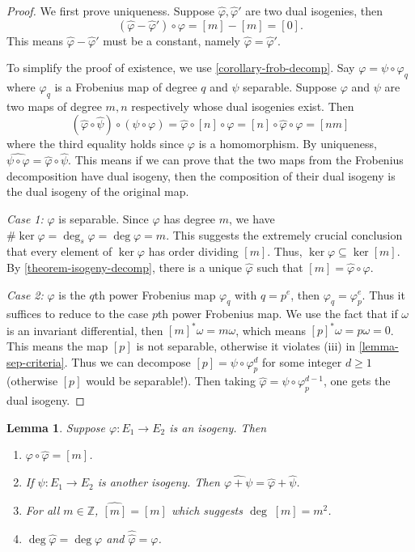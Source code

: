 \documentclass[12pt]{article}
\newtheorem{lemma}{Lemma}[subsection]
\theoremstyle{remark}
\theoremstyle{definition}
\newcommand{\w}[0]{\omega}
\newcommand{\Z}[0]{\mathbb{Z}}
\begin{document}
    \begin{proof}
        We first prove uniqueness. Suppose $\hat\varphi,\hat\varphi'$ are two dual isogenies, then \[\left(\hat\varphi-\hat\varphi'\right)\circ\varphi=[m]-[m]=[0].\] 
        This means $\hat\varphi-\hat\varphi'$ must be a constant, namely $\hat\varphi=\hat\varphi'$.

        To simplify the proof of existence, we use \autoref{corollary-frob-decomp}. Say $\varphi=\psi\circ\varphi_q$ where $\varphi_q$ is a Frobenius map of degree $q$ and $\psi$ separable. Suppose $\varphi$ and $\psi$ are two maps of degree $m,n$ respectively whose dual isogenies exist. Then 
        \[(\hat{\varphi}\circ\hat\psi)\circ(\psi\circ\varphi)=\hat\varphi\circ[n]\circ\varphi=[n]\circ\hat\varphi\circ\varphi=[nm]\]
        where the third equality holds since $\varphi$ is a homomorphism. By uniqueness, $\widehat{\psi\circ\varphi}=\hat{\varphi}\circ\hat\psi$. This means if we can prove that the two maps from the Frobenius decomposition have dual isogeny, then the composition of their dual isogeny is the dual isogeny of the original map.
        
        \textit{Case 1: }$\varphi$ is separable. Since $\varphi$ has degree $m$, we have $\#\ker\varphi=\deg_s\varphi=\deg\varphi=m$. This suggests the extremely crucial conclusion that every element of $\ker\varphi$ has order dividing $[m]$. Thus, $\ker\varphi\subseteq \ker[m]$. By \autoref{theorem-isogeny-decomp}, there is a unique $\hat\varphi$ such that $[m]=\hat\varphi\circ\varphi$.
        
        \textit{Case 2: }$\varphi$ is the $q$th power Frobenius map $\varphi_q$ with $q=p^e$, then $\varphi_q=\varphi_p^e$. Thus it suffices to reduce to the case $p$th power Frobenius map. We use the fact that if $\w$ is an invariant differential, then $[m]^*\w=m\w$, which means $[p]^*\w=p\w=0$. This means the map $[p]$ is not separable, otherwise it violates (iii) in \autoref{lemma-sep-criteria}. Thus we can decompose $[p]=\psi\circ\varphi_p^d$ for some integer $d\geqslant 1$ (otherwise $[p]$ would be separable!). Then taking $\hat\varphi=\psi\circ\varphi_p^{d-1}$, one gets the dual isogeny.
    \end{proof}
    \begin{lemma}\label{lemma-dual-prop}
        Suppose $\varphi:E_1\to E_2$ is an isogeny. Then
        \begin{enumerate}[\normalfont(i)]
            \item $\varphi\circ\hat\varphi=[m]$.
            \item If $\psi:E_1\to E_2$ is another isogeny. Then $\widehat{\varphi+\psi}=\hat\varphi+\hat\psi$.
            \item For all $m\in\Z$, $\widehat{[m]}=[m]$ which suggests $\deg\; [m]=m^2$.
            \item $\deg\hat\varphi=\deg\varphi$ and $\hat{\hat\varphi}=\varphi$.
        \end{enumerate}
    \end{lemma}
\end{document}

